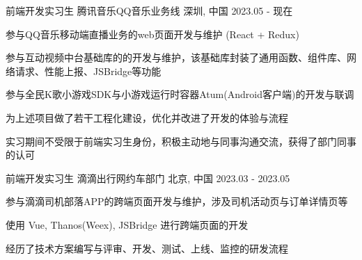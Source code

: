 

\begin{cventries}
    \cventry
    {前端开发实习生} %
    {腾讯音乐\hspace{2mm}QQ音乐业务线} %
    {深圳, 中国} %
    {2023.05 - 现在} %
    {
        \begin{cvitems} %
            \item {参与QQ音乐移动端直播业务的web页面开发与维护 (React + Redux)}
            \item {参与互动视频中台基础库的的开发与维护，该基础库封装了通用函数、组件库、网络请求、性能上报、JSBridge等功能}
            \item {参与全民K歌小游戏SDK与小游戏运行时容器Atum(Android客户端)的开发与联调}
            \item {为上述项目做了若干工程化建设，优化并改进了开发的体验与流程}
            \item {实习期间不受限于前端实习生身份，积极主动地与同事沟通交流，获得了部门同事的认可}
        \end{cvitems}
    }

    \cventry
    {前端开发实习生} %
    {滴滴出行\hspace{2mm}网约车部门} %
    {北京, 中国} %
    {2023.03 - 2023.05} %
    {
        \begin{cvitems} %
            \item {参与滴滴司机部落APP的跨端页面开发与维护，涉及司机活动页与订单详情页等}
            \item {使用 Vue, Thanos(Weex), JSBridge 进行跨端页面的开发}
            \item {经历了技术方案编写与评审、开发、测试、上线、监控的研发流程}
        \end{cvitems}
    }
\end{cventries}
